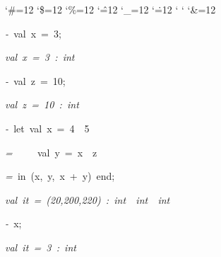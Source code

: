 \begin{list}{}
{\setlength{\leftmargin}{\leftmargini}
\setlength{\rightmargin}{0cm}
\setlength{\itemindent}{0cm}
\setlength{\listparindent}{0cm}
\setlength{\itemsep}{0cm}
\setlength{\parsep}{0cm}
\setlength{\labelsep}{0cm}
\setlength{\labelwidth}{0cm}
\catcode`\#=12
\catcode`\$=12
\catcode`\%=12
\catcode`\^=12
\catcode`\_=12
\catcode`\.=12
\catcode`
\catcode`
\catcode`\&=12
\ttfamily}
\small
\item[]\textsl{-\ }val\ x\ =\ 3;
\item[]\textsl{val\ x\ =\ 3\ :\ int}
\item[]\textsl{-\ }val\ z\ =\ 10;
\item[]\textsl{val\ z\ =\ 10\ :\ int}
\item[]\textsl{-\ }let\ val\ x\ =\ 4\ \ 5
\item[]\textsl{=\ }\ \ \ \ val\ y\ =\ x\ \ z
\item[]\textsl{=\ }in\ (x,\ y,\ x\ +\ y)\ end;
\item[]\textsl{val\ it\ =\ (20,200,220)\ :\ int\ \ int\ \ int}
\item[]\textsl{-\ }x;
\item[]\textsl{val\ it\ =\ 3\ :\ int}
\end{list}
